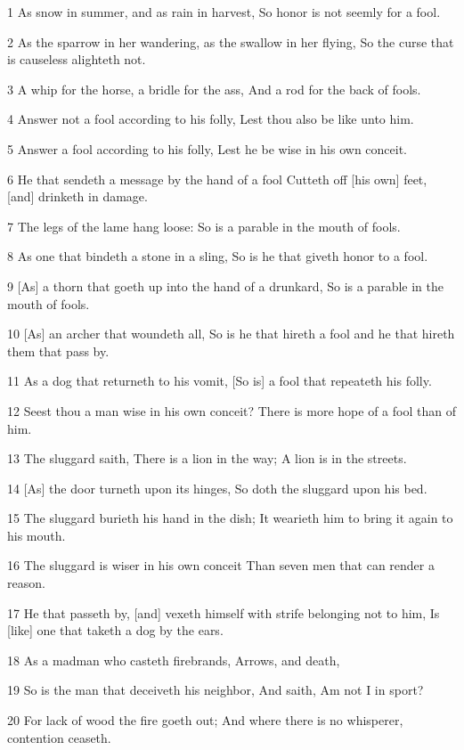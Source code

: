 \par 1 As snow in summer, and as rain in harvest, So honor is not seemly for a fool.
\par 2 As the sparrow in her wandering, as the swallow in her flying, So the curse that is causeless alighteth not.
\par 3 A whip for the horse, a bridle for the ass, And a rod for the back of fools.
\par 4 Answer not a fool according to his folly, Lest thou also be like unto him.
\par 5 Answer a fool according to his folly, Lest he be wise in his own conceit.
\par 6 He that sendeth a message by the hand of a fool Cutteth off [his own] feet, [and] drinketh in damage.
\par 7 The legs of the lame hang loose: So is a parable in the mouth of fools.
\par 8 As one that bindeth a stone in a sling, So is he that giveth honor to a fool.
\par 9 [As] a thorn that goeth up into the hand of a drunkard, So is a parable in the mouth of fools.
\par 10 [As] an archer that woundeth all, So is he that hireth a fool and he that hireth them that pass by.
\par 11 As a dog that returneth to his vomit, [So is] a fool that repeateth his folly.
\par 12 Seest thou a man wise in his own conceit? There is more hope of a fool than of him.
\par 13 The sluggard saith, There is a lion in the way; A lion is in the streets.
\par 14 [As] the door turneth upon its hinges, So doth the sluggard upon his bed.
\par 15 The sluggard burieth his hand in the dish; It wearieth him to bring it again to his mouth.
\par 16 The sluggard is wiser in his own conceit Than seven men that can render a reason.
\par 17 He that passeth by, [and] vexeth himself with strife belonging not to him, Is [like] one that taketh a dog by the ears.
\par 18 As a madman who casteth firebrands, Arrows, and death,
\par 19 So is the man that deceiveth his neighbor, And saith, Am not I in sport?
\par 20 For lack of wood the fire goeth out; And where there is no whisperer, contention ceaseth.
